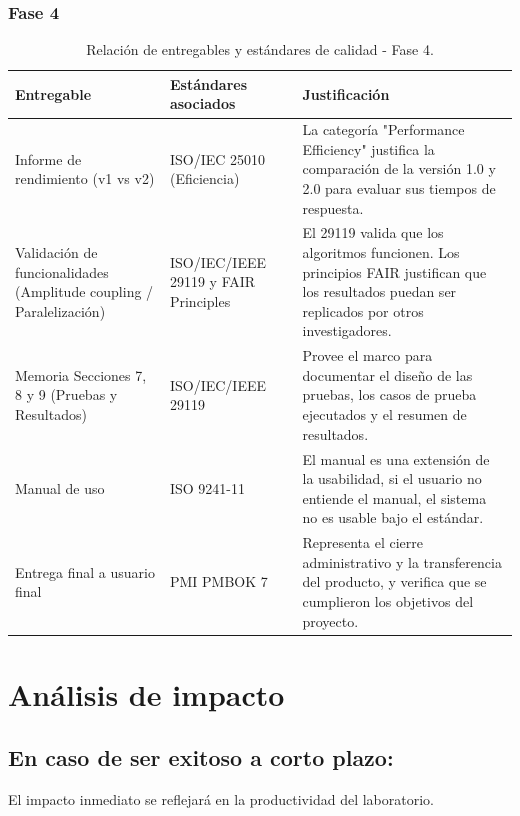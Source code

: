 \documentclass[12pt,letterpaper]{article}
\begin{document}
\subsubsection{Fase 4}
\begin{table}[H]
\small
\centering
\renewcommand{\arraystretch}{1.4}
\begin{tabularx}{\textwidth}{|>{\hsize=0.7\hsize}X|>{\hsize=0.8\hsize}X|>{\hsize=1.5\hsize}X|}
\hline
\textbf{Entregable} & \textbf{Estándares asociados} & \textbf{Justificación} \\ \hline
Informe de rendimiento (v1 vs v2) & ISO/IEC 25010 (Eficiencia) & La categoría "Performance Efficiency" justifica la comparación de la versión 1.0 y 2.0 para evaluar sus tiempos de respuesta. \\ \hline

Validación de funcionalidades (Amplitude coupling / Paralelización) & ISO/IEC/IEEE 29119 y FAIR Principles & El 29119 valida que los algoritmos funcionen. Los principios FAIR justifican que los resultados puedan ser replicados por otros investigadores. \\ \hline

Memoria Secciones 7, 8 y 9 (Pruebas y Resultados) & ISO/IEC/IEEE 29119 & Provee el marco para documentar el diseño de las pruebas, los casos de prueba ejecutados y el resumen de resultados. \\ \hline

Manual de uso & ISO 9241-11 & El manual es una extensión de la usabilidad, si el usuario no entiende el manual, el sistema no es usable bajo el estándar. \\ \hline

Entrega final a usuario final & PMI PMBOK 7 & Representa el cierre administrativo y la transferencia del producto, y verifica que se cumplieron los objetivos del proyecto. \\ \hline
\end{tabularx}
\caption{Relación de entregables y estándares de calidad - Fase 4.}
\end{table}

\newpage




\section{Análisis de impacto}

\subsection{En caso de ser exitoso a corto plazo:} 
El impacto inmediato se reflejará en la productividad del laboratorio.
\end{document}
